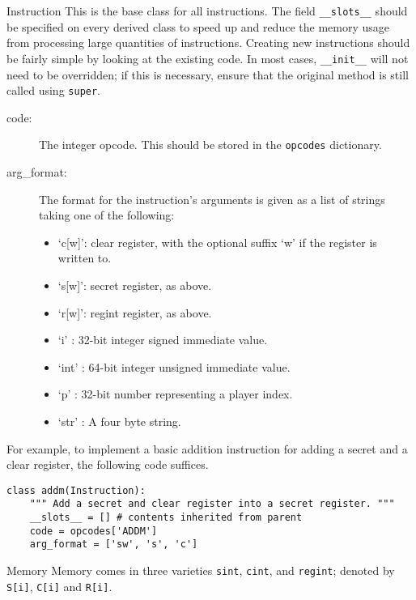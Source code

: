 \begin{class}{Instruction}
This is the base class for all instructions. The field \verb|__slots__| should
be specified on every derived class to speed up and reduce the memory usage from
processing large quantities of instructions. Creating new instructions should
be fairly simple by looking at the existing code. In most cases,
\verb|__init__| will not need to be overridden; if this is necessary, ensure
that the original method is still called using \verb|super|.

\begin{description}
\item[code:] The integer opcode. This should be stored in the \verb|opcodes|
dictionary.
\item[arg_format:] The format for the instruction's arguments is given as a
list of strings taking one of the following:
\begin{itemize}
\item `c[w]': clear register, with the optional suffix `w' if the register is
written to.
\item `s[w]': secret register, as above.
\item `r[w]': regint register, as above.
\item `i'   : 32-bit integer signed immediate value.
\item `int' : 64-bit integer unsigned immediate value.
\item `p'   : 32-bit number representing a player index.
\item `str' : A four byte string.
\end{itemize}
\end{description}

For example, to implement a basic addition instruction for adding a secret
and a clear register, the following code suffices.

\begin{lstlisting}
class addm(Instruction):
    """ Add a secret and clear register into a secret register. """
    __slots__ = [] # contents inherited from parent
    code = opcodes['ADDM']
    arg_format = ['sw', 's', 'c']
\end{lstlisting}

\end{class}

\begin{class}{Memory}
Memory comes in three varieties \verb+sint+, \verb+cint+, and
\verb+regint+; denoted by \verb+S[i]+, \verb+C[i]+ and \verb+R[i]+.
\end{class}

